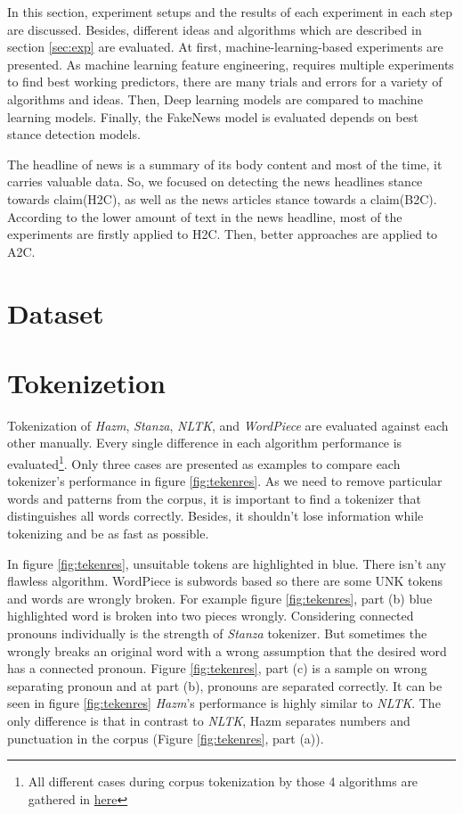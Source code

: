 In this section, experiment setups and the results of each experiment in each step are discussed. Besides, different ideas and algorithms which are described in section \ref{sec:exp} are evaluated. At first, machine-learning-based experiments are presented. As machine learning feature engineering, requires multiple experiments to find best working predictors, there are many trials and errors for a variety of algorithms and ideas. Then, Deep learning models are compared to machine learning models. Finally, the FakeNews model is evaluated depends on best stance detection models.

The headline of news is a summary of its body content and most of the time, it carries valuable data. So, we focused on detecting the news headlines stance towards claim(H2C), as well as the news articles stance towards a claim(B2C). According to the lower amount of text in the news headline, most of the experiments are firstly applied to H2C. Then, better approaches are applied to A2C.  


\section{Dataset}
\label{sec:dataset}



\section{Tokenizetion}
Tokenization of \textit{Hazm}, \textit{Stanza}, \textit{NLTK}, and \textit{WordPiece} are evaluated against each other manually. Every single difference in each algorithm performance is evaluated\footnote{All different cases during corpus tokenization by those 4 algorithms are gathered in \href{https://docs.google.com/document/d/1SlRBnoyLntLJ5yalWXZ1EqJ0wRj4DyiEMJdewkEkrTM/edit?usp=sharing}{here}}. Only three cases are presented as examples to compare each tokenizer's performance in figure \ref{fig:tekenres}. As we need to remove particular words and patterns from the corpus,  it is important to find a tokenizer that distinguishes all words correctly. Besides, it shouldn't lose information while tokenizing and be as fast as possible. 

In figure \ref{fig:tekenres}, unsuitable tokens are highlighted in blue. There isn't any flawless algorithm. WordPiece is subwords based so there are some UNK tokens and words are wrongly broken. For example figure \ref{fig:tekenres}, part (b) blue highlighted word is broken into two pieces wrongly. Considering connected pronouns individually is the strength of \textit{Stanza} tokenizer. But sometimes the  wrongly breaks an original word with a wrong assumption that the desired word has a connected pronoun. Figure \ref{fig:tekenres}, part (c) is a sample on wrong separating pronoun and at part (b), pronouns are separated correctly. It can be seen in figure \ref{fig:tekenres} \textit{Hazm}'s performance is highly similar to \textit{NLTK}. The only difference is that in contrast to \textit{NLTK}, Hazm separates numbers and punctuation in the corpus (Figure \ref{fig:tekenres}, part (a)). 

